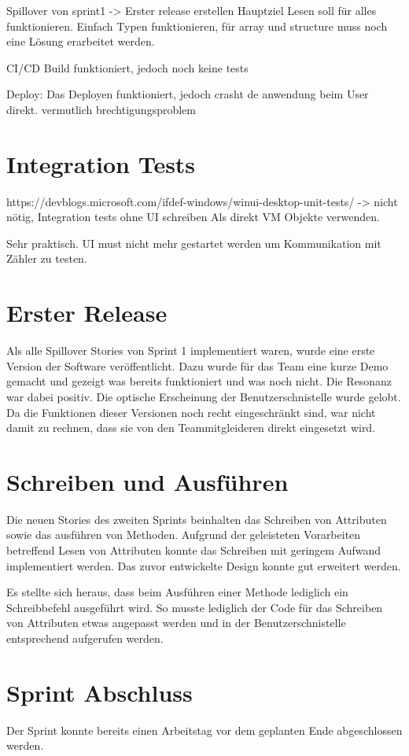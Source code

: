 
Spillover von sprint1
-> Erster release erstellen Hauptziel
Lesen soll für alles funktionieren.
Einfach Typen funktionieren, für array und structure muss noch eine Lösung erarbeitet werden.

CI/CD
Build funktioniert, jedoch noch keine tests

Deploy:
Das Deployen funktioniert, jedoch crasht de anwendung beim User direkt.
vermutlich brechtigungsproblem


\section{Integration Tests}
https://devblogs.microsoft.com/ifdef-windows/winui-desktop-unit-tests/
-> nicht nötig, Integration tests ohne UI schreiben
Als direkt VM Objekte verwenden.


Sehr praktisch. UI must nicht mehr gestartet werden um Kommunikation mit Zähler zu testen.


\section{Erster Release}
Als alle Spillover Stories von Sprint 1 implementiert waren, wurde eine erste Version der Software veröffentlicht.
Dazu wurde für das Team eine kurze Demo gemacht und gezeigt was bereits funktioniert und was noch nicht. 
Die Resonanz war dabei positiv. Die optische Erscheinung der Benutzerschnistelle wurde gelobt.
Da die Funktionen dieser Versionen noch recht eingeschränkt sind, war nicht damit zu rechnen, dass sie von den Teammitgleideren direkt eingesetzt wird.



\section{Schreiben und Ausführen}
Die neuen Stories des zweiten Sprints beinhalten das Schreiben von Attributen sowie das ausführen von Methoden.
Aufgrund der geleisteten Vorarbeiten betreffend Lesen von Attributen konnte das Schreiben mit geringem Aufwand implementiert werden.
Das zuvor entwickelte Design konnte gut erweitert werden.

Es stellte sich heraus, dass beim Ausführen einer Methode lediglich ein Schreibbefehl ausgeführt wird.
So musste lediglich der Code für das Schreiben von Attributen etwas angepasst werden und in der Benutzerschnistelle entsprechend aufgerufen werden.


\section{Sprint Abschluss}
Der Sprint konnte bereits einen Arbeitstag vor dem geplanten Ende abgeschlossen werden.